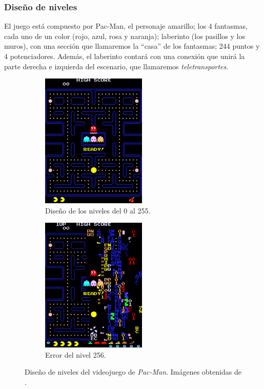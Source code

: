 \subsubsection{Diseño de niveles}

El juego está compuesto por Pac-Man, el personaje amarillo; los 4 fantasmas, cada uno de un color (rojo, azul, rosa y naranja); laberinto (los pasillos y los muros), con una sección que llamaremos la ``casa'' de los fantasmas; 244 puntos y 4 potenciadores. Además, el laberinto contará con una conexión que unirá la parte derecha e izquierda del escenario, que llamaremos \textit{teletransportes}.

 \begin{figure}[H]
    \centering
        \begin{subfigure}[b]{0.4\textwidth}
        \centering
            \includegraphics[width=5cm]{img/lvl1.png}
        \caption{Diseño de los niveles del 0 al 255.}
        \end{subfigure}
        \hspace{1cm}
        \begin{subfigure}[b]{0.4\textwidth}
        \centering
            \includegraphics[width=5cm]{img/Level 256.png}
            \caption{Error del nivel 256.}
        \end{subfigure}
        \caption{Diseño de niveles del videojuego de \textit{Pac-Man}. Imágenes obtenidas de \cite{pittman2015}.}
        \label{fig:niveles}
    \end{figure}

